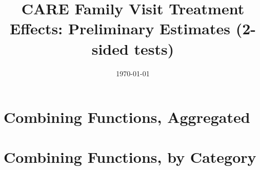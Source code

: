 
 

\title{CARE Family Visit Treatment Effects: Preliminary Estimates (2-sided tests)} 

\date{\today} 

 

\maketitle 

\tableofcontents 

\clearpage 


\def\arraystretch{0.6}

\setlength\tabcolsep{0.3em}

\section{{Combining Functions, Aggregated}}


\begin{center}
	
\end{center}

\begin{center}
	
\end{center}

\begin{center}
	
\end{center}
\section{{Combining Functions, by Category}}


\begin{center}
	
\end{center}

\begin{center}
	
\end{center}

\begin{center}
	
\end{center}

\begin{center}
	
\end{center}

\begin{center}
	
\end{center}


